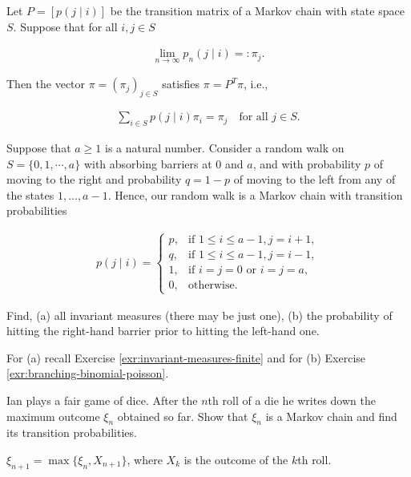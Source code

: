 \begin{Proposition}
\label{prp:invariant-measure}
Let $P = [p(j \mid i)]$ be the transition matrix of a Markov chain with state space $S$. Suppose that for all $i,j\in S$

\begin{align}
\lim_{n\to\infty} p_n(j \mid i) =: \pi_j. \tag{5.47}
\end{align}

Then the vector $\pi = (\pi_j)_{j\in S}$ satisfies $\pi = P^T \pi$, i.e.,

\begin{align}
\sum_{i\in S} p(j \mid i) \pi_i = \pi_j \quad \text{for all } j\in S. \tag{5.65}
\end{align}
\end{Proposition}

\begin{Theorem}
\label{thrm:poisson-binomial}
Suppose that $a \geq 1$ is a natural number. Consider a random walk on $S = \{0,1,\cdots,a\}$ with absorbing barriers at 0 and $a$, and with probability $p$ of moving to the right and probability $q = 1-p$ of moving to the left from any of the states $1,\ldots,a-1$. Hence, our random walk is a Markov chain with transition probabilities

\begin{align}
p(j \mid i) = \begin{cases}
p, & \text{if } 1 \leq i \leq a-1, j = i+1, \\
q, & \text{if } 1 \leq i \leq a-1, j = i-1, \\
1, & \text{if } i = j = 0 \text{ or } i = j = a, \\
0, & \text{otherwise}.
\end{cases}
\end{align}

Find, (a) all invariant measures (there may be just one), (b) the probability of hitting the right-hand barrier prior to hitting the left-hand one.

\begin{hint}
For (a) recall Exercise \ref{exr:invariant-measures-finite} and for (b) Exercise \ref{exr:branching-binomial-poisson}.
\end{hint}
\end{Theorem}

\begin{Exercise}
\label{exr:dice-maximum}
Ian plays a fair game of dice. After the $n$th roll of a die he writes down the maximum outcome $\xi_n$ obtained so far. Show that $\xi_n$ is a Markov chain and find its transition probabilities.

\begin{hint}
$\xi_{n+1} = \max\{\xi_n, X_{n+1}\}$, where $X_k$ is the outcome of the $k$th roll.
\end{hint}
\end{Exercise}


